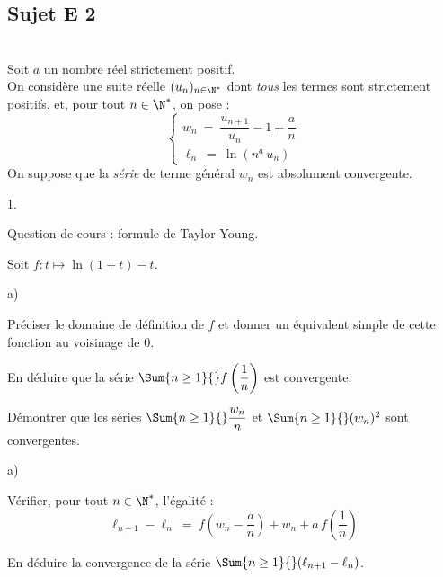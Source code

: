 \documentclass[11pt]{article}%
\begin{document}
\subsection*{Sujet E 2}

\begin{exerciceAP}~\\
  Soit $a$ un nombre réel strictement positif.\\
  On considère une suite réelle $(u_n)_{n \in \N^*}$ dont {\it tous}
  les termes sont strictement positifs, et, pour tout $n \in \N^*$, on
  pose :
  \[
    \left\{
      \begin{array}{l}
        w_n \ = \ \dfrac{u_{n+1}}{u_n} - 1+ \dfrac{a}{n}
        \\[.6cm]
        \ell_n \ = \ \ln\left(n^a \, u_n\right)
      \end{array}
    \right.
  \]
  On suppose que la {\it série} de terme général $w_n$ est absolument
  convergente.
  \begin{noliste}{1.}
  \item Question de cours : formule de Taylor-Young.
    
  \item Soit $f: t \mapsto \ln(1+t) -t$.
    \begin{noliste}{a)}
    \item Préciser le domaine de définition de $f$ et donner un
      équivalent simple de cette fonction au voisinage de $0$.
      
    \item En déduire que la série $\Sum{n \geq 1}{} f\left(
        \dfrac{1}{n} \right)$ est convergente.
    \end{noliste}
    
  \item Démontrer que les séries $\Sum{n \geq 1}{} \dfrac{w_n}{n}$
    et $\Sum{n \geq 1}{} (w_n)^2$ sont convergentes.
    
  \item 
    \begin{noliste}{a)}
    \item Vérifier, pour tout $n \in \N^*$, l'égalité :
      \[
        \ell_{n+1} - \ell_n \ = \ f\left(w_n - \dfrac{a}{n}\right) + w_n + a
        \, f \left( \dfrac{1}{n}\right)
      \]
      
    \item En déduire la convergence de la série $\Sum{n \geq 1}{}
      (\ell_{n+1} - \ell_n)$.
    \end{noliste}
    

\end{noliste}
\end{exerciceAP}
\end{document}
